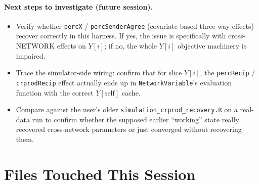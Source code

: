 \documentclass[11pt]{article}
\newcommand{\self}{\mathrm{self}}
\newcommand{\file}[1]{\texttt{#1}}
\begin{document}
\paragraph{Next steps to investigate (future session).}
\begin{itemize}[leftmargin=*]
  \item Verify whether \texttt{percX} / \texttt{percSenderAgree}
        (covariate-based three-way effects) recover correctly in this
        harness.  If yes, the issue is specifically with
        cross-NETWORK effects on $Y[i]$; if no, the whole $Y[i]$
        objective machinery is impaired.
  \item Trace the simulator-side wiring: confirm that for slice
        $Y[i]$, the \texttt{percRecip} / \texttt{crprodRecip} effect
        actually ends up in \texttt{NetworkVariable}'s evaluation
        function with the correct $Y[\self]$ cache.
  \item Compare against the user's older
        \file{simulation\_crprod\_recovery.R} on a real-data run to
        confirm whether the supposed earlier ``working'' state really
        recovered cross-network parameters or just converged without
        recovering them.
\end{itemize}

\section{Files Touched This Session}
\end{document}
